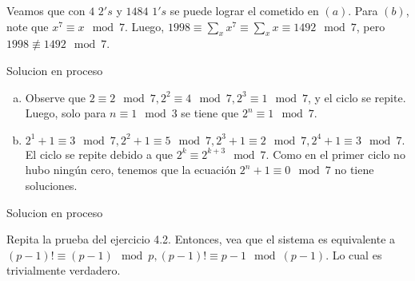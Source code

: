 \begin{sol}
	Veamos que con $4$ $2's$ y $1484$ $1's$ se puede lograr el cometido en $(a)$. Para $(b)$, note que $x^{7} \equiv x \mod 7$. Luego, $1998 \equiv \sum_{x} x^{7} \equiv \sum_{x} x \equiv 1492 \mod 7$, pero $1998 \not\equiv 1492 \mod 7$.
\end{sol}

\begin{sol}
	Solucion en proceso
\end{sol}

\begin{sol}
	\begin{enumerate}[a.]
		\item Observe que $2 \equiv 2 \mod 7, 2^2 \equiv 4 \mod 7, 2^3 \equiv 1 \mod 7$, y el ciclo se repite. Luego, solo para $n \equiv 1 \mod 3 $ se tiene que $2^n \equiv 1 \mod 7$.
		\item$ 2^1 +1 \equiv 3 \mod 7, 2^2+1 \equiv 5 \mod 7, 2^3 +1 \equiv 2 \mod 7, 2^4+1 \equiv 3 \mod 7. $ El ciclo se repite debido a que $2^k \equiv 2^{k+3} \mod 7$. Como en el primer ciclo no hubo ning\'un cero, tenemos que la ecuaci\'on $2^n +1 \equiv 0 \mod 7 $ no tiene soluciones.
	\end{enumerate}
\end{sol}

\begin{sol}
	Solucion en proceso
\end{sol}

\begin{sol}
	Repita la prueba del ejercicio 4.2. Entonces, vea que el sistema es equivalente a $(p-1)! \equiv (p-1) \mod p, (p-1)! \equiv p-1 \mod (p-1)$. Lo cual es trivialmente verdadero.
\end{sol}



